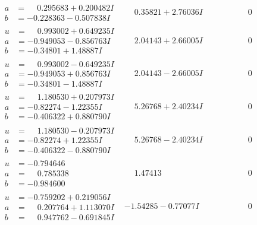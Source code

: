 \documentclass[1p]{elsarticle_modified}
\theoremstyle{definition}
\begin{document}
$$\begin{array}{c|c|c}
\begin{aligned}
a &= \phantom{-}0.295683 + 0.200482 I \\
b &= -0.228363 - 0.507838 I\end{aligned}
 & \phantom{-}0.35821 + 2.76036 I & \phantom{-0.000000 } 0 \\ \hline\begin{aligned}
u &= \phantom{-}0.993002 + 0.649235 I \\
a &= -0.949053 - 0.856763 I \\
b &= -0.34801 + 1.48887 I\end{aligned}
 & \phantom{-}2.04143 + 2.66005 I & \phantom{-0.000000 } 0 \\ \hline\begin{aligned}
u &= \phantom{-}0.993002 - 0.649235 I \\
a &= -0.949053 + 0.856763 I \\
b &= -0.34801 - 1.48887 I\end{aligned}
 & \phantom{-}2.04143 - 2.66005 I & \phantom{-0.000000 } 0 \\ \hline\begin{aligned}
u &= \phantom{-}1.180530 + 0.207973 I \\
a &= -0.82274 - 1.22355 I \\
b &= -0.406322 + 0.880790 I\end{aligned}
 & \phantom{-}5.26768 + 2.40234 I & \phantom{-0.000000 } 0 \\ \hline\begin{aligned}
u &= \phantom{-}1.180530 - 0.207973 I \\
a &= -0.82274 + 1.22355 I \\
b &= -0.406322 - 0.880790 I\end{aligned}
 & \phantom{-}5.26768 - 2.40234 I & \phantom{-0.000000 } 0 \\ \hline\begin{aligned}
u &= -0.794646\phantom{ +0.000000I} \\
a &= \phantom{-}0.785338\phantom{ +0.000000I} \\
b &= -0.984600\phantom{ +0.000000I}\end{aligned}
 & \phantom{-}1.47413\phantom{ +0.000000I} & \phantom{-0.000000 } 0 \\ \hline\begin{aligned}
u &= -0.759202 + 0.219056 I \\
a &= \phantom{-}0.207764 + 1.113070 I \\
b &= \phantom{-}0.947762 - 0.691845 I\end{aligned}
 & -1.54285 - 0.77077 I & \phantom{-0.000000 } 0 \\ \hline\begin{aligned}

\end{aligned}
\end{array}$$
\end{document}

